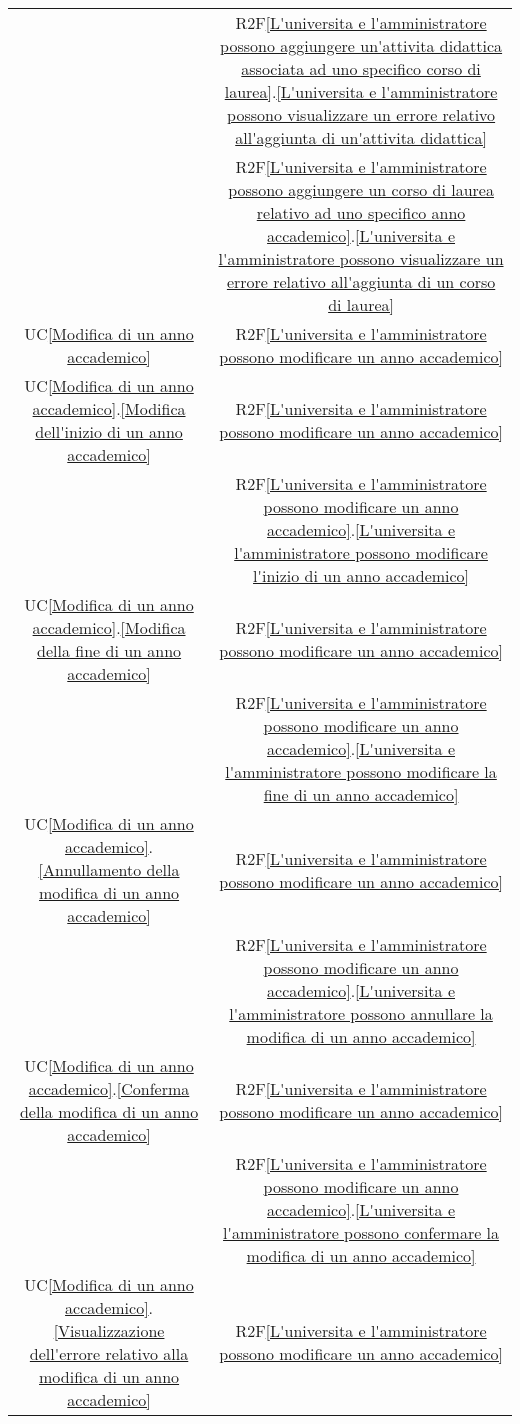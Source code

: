 \begin{longtable}{|c|c|}
& R2F\ref{L'universita e l'amministratore possono aggiungere un'attivita didattica associata ad uno specifico corso di laurea}.\ref{L'universita e l'amministratore possono visualizzare un errore relativo all'aggiunta di un'attivita didattica}\\
& R2F\ref{L'universita e l'amministratore possono aggiungere un corso di laurea relativo ad uno specifico anno accademico}.\ref{L'universita e l'amministratore possono visualizzare un errore relativo all'aggiunta di un corso di laurea}\\
\hline
UC\ref{Modifica di un anno accademico} & R2F\ref{L'universita e l'amministratore possono modificare un anno accademico}\\
\hline
UC\ref{Modifica di un anno accademico}.\ref{Modifica dell'inizio di un anno accademico} & R2F\ref{L'universita e l'amministratore possono modificare un anno accademico}\\
& R2F\ref{L'universita e l'amministratore possono modificare un anno accademico}.\ref{L'universita e l'amministratore possono modificare l'inizio di un anno accademico}\\
\hline
UC\ref{Modifica di un anno accademico}.\ref{Modifica della fine di un anno accademico} & R2F\ref{L'universita e l'amministratore possono modificare un anno accademico}\\
& R2F\ref{L'universita e l'amministratore possono modificare un anno accademico}.\ref{L'universita e l'amministratore possono modificare la fine di un anno accademico}\\
\hline
UC\ref{Modifica di un anno accademico}.\ref{Annullamento della modifica di un anno accademico} & R2F\ref{L'universita e l'amministratore possono modificare un anno accademico}\\
& R2F\ref{L'universita e l'amministratore possono modificare un anno accademico}.\ref{L'universita e l'amministratore possono annullare la modifica di un anno accademico}\\
\hline
UC\ref{Modifica di un anno accademico}.\ref{Conferma della modifica di un anno accademico} & R2F\ref{L'universita e l'amministratore possono modificare un anno accademico}\\
& R2F\ref{L'universita e l'amministratore possono modificare un anno accademico}.\ref{L'universita e l'amministratore possono confermare la modifica di un anno accademico}\\
\hline
 UC\ref{Modifica di un anno accademico}.\ref{Visualizzazione dell'errore relativo alla modifica di un anno accademico} & R2F\ref{L'universita e l'amministratore possono modificare un anno accademico}\\

\end{longtable}

